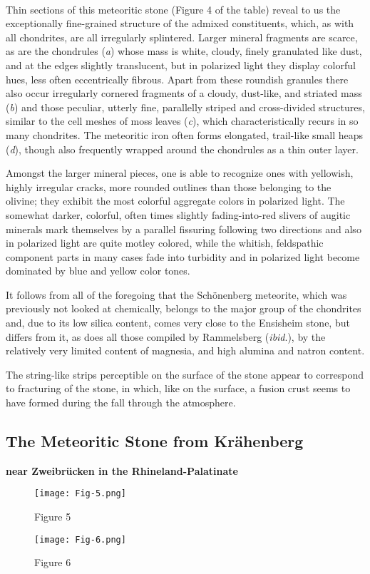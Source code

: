 \documentclass[a4paper, 12pt, oneside]{article}
\begin{document}
\paragraph{}
Thin sections of this meteoritic stone (Figure 4 of the table) reveal to us the exceptionally fine-grained structure of the admixed constituents, which, as with all chondrites, are all irregularly splintered. Larger mineral fragments are scarce, as are the chondrules (\emph{a}) whose mass is white, cloudy, finely granulated like dust, and at the edges slightly translucent, but in polarized light they display colorful hues, less often eccentrically fibrous. Apart from these roundish granules there also occur irregularly cornered fragments of a cloudy, dust-like, and striated mass (\emph{b}) and those peculiar, utterly fine, parallelly striped and cross-divided structures, similar to the cell meshes of moss leaves (\emph{c}), which characteristically recurs in so many chondrites. The meteoritic iron often forms elongated, trail-like small heaps (\emph{d}), though also frequently wrapped around the chondrules as a thin outer layer.

Amongst the larger mineral pieces, one is able to recognize ones with yellowish, highly irregular cracks, more rounded outlines than those belonging to the olivine; they exhibit the most colorful aggregate colors in polarized light. The somewhat darker, colorful, often times slightly fading-into-red slivers of augitic minerals mark themselves by a parallel fissuring following two directions and also in polarized light are quite motley colored, while the whitish, feldspathic component parts in many cases fade into turbidity and in polarized light become dominated by blue and yellow color tones.

It follows from all of the foregoing that the Schönenberg meteorite, which was previously not looked at chemically, belongs to the major group of the chondrites and, due to its low silica content, comes very close to the Ensisheim stone, but differs from it, as does all those compiled by Rammelsberg (\emph{ibid}.), by the relatively very limited content of magnesia, and high alumina and natron content.

The string-like strips perceptible on the surface of the stone appear to correspond to fracturing of the stone, in which, like on the surface, a fusion crust seems to have formed during the fall through the atmosphere.
\clearpage

\subsection{The Meteoritic Stone from Krähenberg}
\textbf{near Zweibrücken in the Rhineland-Palatinate}
\begin{figure}[h]
\centering
\texttt{[image: Fig-5.png]}
\caption{Figure 5}
\end{figure}
\begin{figure}[h]
\centering
\texttt{[image: Fig-6.png]}
\caption{Figure 6}
\end{figure}
\end{document}
